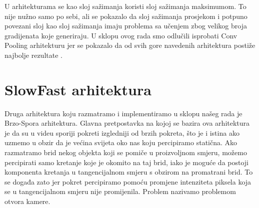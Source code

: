 \documentclass[times, utf8, diplomski,  numeric]{fer}
\begin{document}
\par
U arhitekturama se kao sloj sažimanja koristi sloj sažimanja maksimumom. To nije nužno samo po sebi, ali se pokazalo da sloj sažimanja prosjekom i potpuno povezani sloj kao sloj sažimanja imaju problema sa učenjem zbog velikog broja gradijenata koje generiraju. U sklopu ovog rada smo odlučili isprobati Conv Pooling arhitekturu jer se pokazalo da od svih gore navedenih arhitektura postiže najbolje rezultate \cite{feature-pooling}.
\newpage
\section{SlowFast arhitektura}
\label{section:slowfast-cite}
Druga arhitektura koju razmatramo i implementiramo u sklopu našeg rada je Brzo-Spora  arhitektura. Glavna pretpostavka na kojoj se bazira ova arhitektura je da su u videu sporiji pokreti izgledniji od brzih pokreta, što je i istina ako uzmemo u obzir da je većina svijeta oko nas koju percipiramo statična. Ako razmatramo brid nekog objekta koji se pomiče u proizvoljnom smjeru, možemo percipirati samo kretanje koje je okomito na taj brid, iako je moguće da postoji komponenta kretanja u tangencijalnom smjeru s obzirom na promatrani brid. To se događa zato jer pokret percipiramo pomoću promjene intenziteta piksela koja se u tangencijalnom smjeru nije promijenila. Problem nazivamo problemom otvora kamere.
\end{document}
